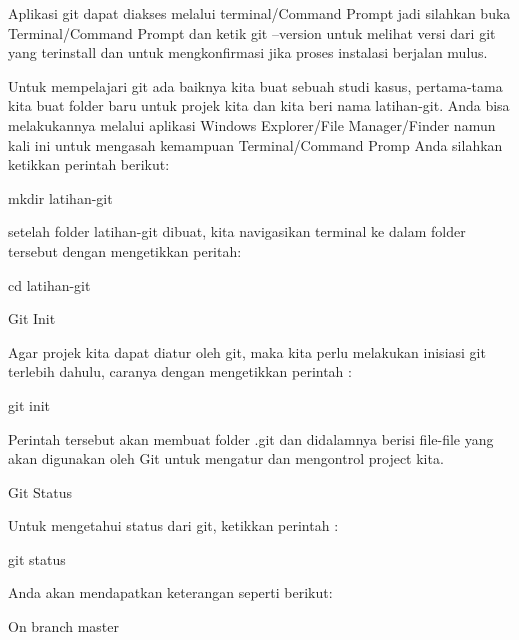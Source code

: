 \vspace{12pt}
\noindent 
Aplikasi git dapat diakses melalui terminal/Command Prompt jadi silahkan buka Terminal/Command Prompt dan ketik $  $git --version $  $untuk melihat versi dari git yang terinstall dan untuk mengkonfirmasi jika proses instalasi berjalan mulus.  \par
\noindent 
Untuk mempelajari git ada baiknya kita buat sebuah studi kasus, pertama-tama kita buat folder baru untuk projek kita dan kita beri nama latihan-git. Anda bisa melakukannya melalui aplikasi Windows Explorer/File Manager/Finder namun kali ini untuk mengasah kemampuan Terminal/Command Promp Anda silahkan ketikkan perintah berikut: \par
\noindent 
 \hspace*{0.5in} mkdir latihan-git \par
\noindent 
setelah folder latihan-git dibuat, kita navigasikan terminal ke dalam folder tersebut dengan mengetikkan peritah: \par
\noindent 
 \hspace*{0.5in} cd latihan-git \par
\vspace{12pt}
\vspace{12pt}
\vspace{12pt}
\vspace{12pt}
\noindent 
 \hspace*{0.5in} Git Init \par
\noindent 
Agar projek kita dapat diatur oleh git, maka kita perlu melakukan inisiasi git terlebih dahulu, caranya dengan mengetikkan perintah : \par
\noindent 
 \hspace*{0.5in} git init \par
\noindent 
Perintah tersebut akan membuat folder .git dan didalamnya berisi file-file yang akan digunakan oleh Git untuk mengatur dan mengontrol project kita. \par
\vspace{12pt}
\noindent 
 \hspace*{0.5in} Git Status \par
\noindent 
Untuk mengetahui status dari git, ketikkan perintah : \par
\noindent 
 \hspace*{0.5in} git status \par
\noindent 
Anda akan mendapatkan keterangan seperti berikut: \par
\noindent 
 \hspace*{0.5in} On branch master \par
